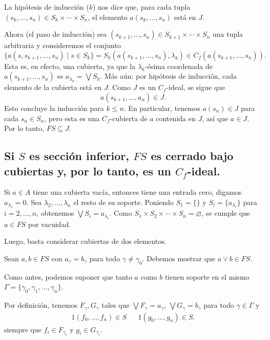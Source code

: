 \documentclass[12pt,letterpaper,titlepage]{article}
\let\emptyset\varnothing
\theoremstyle{definition}
\renewcommand\sup{\vee}
\newcommand\Sup{\bigvee}
\newcommand\tps[2]{\texorpdfstring{#1}{#2}}
\newcommand\<{\langle}
\renewcommand\>{\rangle}
\begin{document}
La hipótesis de inducción ($k$) nos dice que, para cada tupla
$(s_k,\dots,s_n)\in S_k\times\cdots\times S_n$,
el elemento $a(s_k,\dots,s_n)$ está en $J$.

Ahora (el paso de inducción)
sea $(s_{k+1},\dots,s_n)\in S_{k+1}\times\cdots\times S_n$
una tupla arbitraria y consideremos el conjunto
\[
  \{a(s,s_{k+1},\dots,s_n) \mid s\in S_k\}
  =
  S_k(a(s_{k+1},\dots,s_n),\lambda_k)
  \in
  C_f(a(s_{k+1},\dots,s_n))
.\]
Esta es, en efecto, una cubierta, ya que la $\lambda_k$-ésima
coordenada de $a(s_{k+1},\dots,s_n)$ es $a_{\lambda_k}=\Sup S_k$.
Más aún: por hipótesis de inducción, cada elemento
de la cubierta está en $J$.
Como $J$ es un $C_f$-ideal, se sigue que
\[
  a(s_{k+1},\dots,a_n) \in J
.\]
Esto concluye la inducción para $k\leq n$.
En particular, tenemos $a(s_n)\in J$ para cada $s_n\in S_n$,
pero esta es una $C_f$-cubierta de $a$ contenida en $J$,
así que $a\in J$.
Por lo tanto, $FS\subseteq J$.

\subsection{Si \tps{$S$}{S} es sección inferior, \tps{$FS$}{FS} es cerrado bajo
cubiertas y, por lo tanto, es un \tps{$C_f$}{Cf}-ideal.}

Si $a\in A$ tiene una cubierta vacía, entonces tiene una entrada
cero, digamos $a_{\lambda_1}=0$.
Sea $\lambda_2,\dots,\lambda_n$ el resto de su soporte.
Poniendo $S_1=\{\}$ y $S_i=\{a_{\lambda_i}\}$ para $i=2,\dots,n$,
obtenemos $\Sup S_i = a_{\lambda_i}$.
Como $S_1\times S_2\times\cdots\times S_n=\emptyset$,
se cumple que $a\in FS$ por vacuidad.

Luego, basta considerar cubiertas de dos elementos.

Sean $a,b\in FS$ con $a_\gamma=b_\gamma$ para todo
$\gamma\neq\gamma_0$.
Debemos mostrar que $a\sup b\in FS$.

Como antes, podemos suponer que tanto $a$ como $b$ tienen soporte
en el mismo $\Gamma=\{\gamma_0,\gamma_1,\dots,\gamma_n\}$.

Por definición, tenemos $F_\gamma,G_\gamma$ tales que $\Sup
F_\gamma = a_\gamma$, $\Sup G_\gamma = b_\gamma$ para todo
$\gamma\in\Gamma$ y
\begin{align*}
  1(f_0,\dots,f_n)\in S && 1(g_0,\dots,g_n)\in S.
\end{align*}
siempre que $f_i\in F_{\gamma_i}$ y $g_i\in G_{\gamma_i}$.
\end{document}
